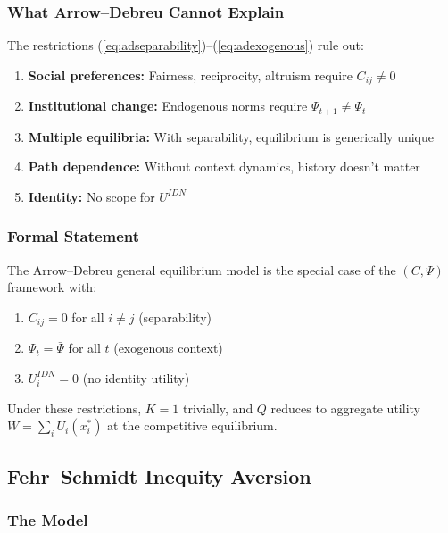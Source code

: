 \subsubsection{What Arrow--Debreu Cannot Explain}

The restrictions (\ref{eq:adseparability})--(\ref{eq:adexogenous}) rule out:
\begin{enumerate}
  \item \textbf{Social preferences:} Fairness, reciprocity, altruism require $C_{ij} \neq 0$
  \item \textbf{Institutional change:} Endogenous norms require $\Psi_{t+1} \neq \Psi_t$
  \item \textbf{Multiple equilibria:} With separability, equilibrium is generically unique
  \item \textbf{Path dependence:} Without context dynamics, history doesn't matter
  \item \textbf{Identity:} No scope for $U^{IDN}$
\end{enumerate}

\subsubsection{Formal Statement}

\begin{proposition}
The Arrow--Debreu general equilibrium model is the special case of the $(C, \Psi)$ framework with:
\begin{enumerate}
  \item $C_{ij} = 0$ for all $i \neq j$ (separability)
  \item $\Psi_t = \bar{\Psi}$ for all $t$ (exogenous context)
  \item $U_i^{IDN} = 0$ (no identity utility)
\end{enumerate}
Under these restrictions, $K = 1$ trivially, and $Q$ reduces to aggregate utility
$W = \sum_i U_i(x_i^*)$ at the competitive equilibrium.
\end{proposition}

\subsection{Fehr--Schmidt Inequity Aversion}
\label{app:fehrschmidt}

\subsubsection{The Model}

